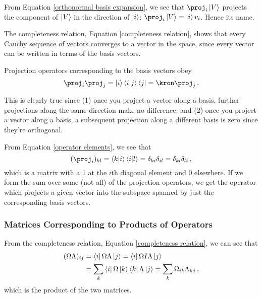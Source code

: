 \begin{remark}
From Equation \eqref{orthonormal basis expansion}, we see that $\proj_i \ket{V}$ projects the component of $\ket{V}$ in the direction of $\ket{i}$: $\proj_i \ket{V} = \ket{i} v_i$. Hence its name.

The completeness relation, Equation \eqref{completeness relation}, shows that every Cauchy sequence of vectors converges to a vector in the space, since every vector can be written in terms of the basis vectors.
\end{remark}

Projection operators corresponding to the basis vectors obey
\begin{equation}\label{repeated projection operators}
    \proj_i \proj_j = \ket{i}\braket{i}{j}\bra{j} = \kron \proj_j\,.
\end{equation}

\begin{remark}
This is clearly true since (1) once you project a vector along a basis, further projections along the same direction make no difference; and (2) once you project a vector along a basis, a subsequent projection along a different basis is zero since they're orthogonal.
\end{remark}

From Equation \eqref{operator elements}, we see that 
\begin{equation}\label{projection matrix elements}
    (\proj_i)_{kl} = \braket{k}{i}\braket{i}{l} = \delta_{ki}\delta_{il} = \delta_{kl}\delta_{li}\,,
\end{equation}
which is a matrix with a 1 at the $i$th diagonal element and 0 elsewhere. If we form the sum over some (not all) of the projection operators, we get the operator which projects a given vector into the subspace spanned by just the corresponding basis vectors.


\subsubsection{Matrices Corresponding to Products of Operators}

From the completeness relation, Equation \eqref{completeness relation}, we can see that
\begin{align}
    (\Omega\Lambda)_{ij} &= \bra{i}\Omega\Lambda\ket{j} = \bra{i}\Omega I \Lambda\ket{j} \\
    &= \sum_k \bra{i}\Omega\ket{k} \bra{k}\Lambda\ket{j} = \sum_k \Omega_{ik}\Lambda_{kj}\,,
\end{align}
which is the product of the two matrices.

